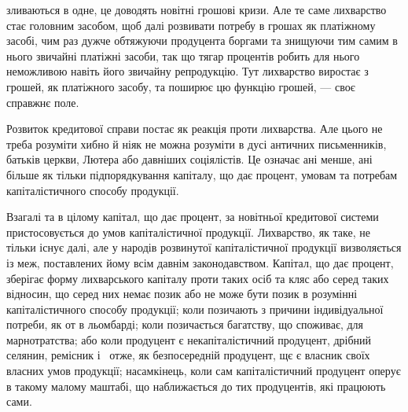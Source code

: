 \parcont{}  %
зливаються в одне, це доводять новітні грошові кризи. Але те саме лихварство стає
головним засобом, щоб далі розвивати потребу в грошах як платіжному засобі,
чим раз дужче обтяжуючи продуцента боргами та знищуючи тим самим в нього
звичайні платіжні засоби, так що тягар процентів робить для нього неможливою
навіть його звичайну репродукцію. Тут лихварство виростає з грошей, як платіжного
засобу, та поширює цю функцію грошей, — своє справжнє поле.

Розвиток кредитової справи постає як реакція проти лихварства. Але цього
не треба розуміти хибно й ніяк не можна розуміти в дусі античних письменників,
батьків церкви, Лютера або давніших соціялістів. Це означає ані менше, ані
більше як тільки підпорядкування капіталу, що дає процент, умовам та потребам
капіталістичного способу продукції.

Взагалі та в цілому капітал, що дає процент, за новітньої кредитової системи
пристосовується до умов капіталістичної продукції. Лихварство, як таке, не
тільки існує далі, але у народів розвинутої капіталістичної продукції визволяється
із меж, поставлених йому всім давнім законодавством. Капітал, що дає
процент, зберігає форму лихварського капіталу проти таких осіб та кляс або
серед таких відносин, що серед них немає позик або не може бути позик в розумінні
капіталістичного способу продукції; коли позичають з причини індивідуальної
потреби, як от в льомбарді; коли позичається багатству, що споживає,
для марнотратства; або коли продуцент є некапіталістичний продуцент, дрібний
селянин, ремісник і~ отже, як безпосередній продуцент, щє є власник своїх
власних умов продукції; насамкінець, коли сам капіталістичний продуцент оперує
в такому малому маштабі, що наближається до тих продуцентів, які працюють сами.

